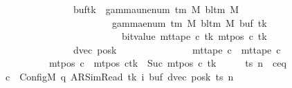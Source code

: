 \begin{isabellebody}
\ \ \ \ \ \ \ \ \ \ \ \ \ \ \ \ \ \ \ \ buf{\isacharparenleft}{\kern0pt}tk\ {\isacharcolon}{\kern0pt}{\isacharequal}{\kern0pt}\ gamma{\isacharunderscore}{\kern0pt}unenum\ {\isacharparenleft}{\kern0pt}{\isasymGamma}{\isacharunderscore}{\kern0pt}tm\ M{\isacharparenright}{\kern0pt}\ {\isacharparenleft}{\kern0pt}bl{\isacharunderscore}{\kern0pt}tm\ M{\isacharparenright}{\kern0pt}\isanewline
\ \ \ \ \ \ \ \ \ \ \ \ \ \ \ \ \ \ \ \ \ \ \ \ \ \ {\isacharparenleft}{\kern0pt}{}\ {\isacharasterisk}{\kern0pt}\ gamma{\isacharunderscore}{\kern0pt}enum\ {\isacharparenleft}{\kern0pt}{\isasymGamma}{\isacharunderscore}{\kern0pt}tm\ M{\isacharparenright}{\kern0pt}\ {\isacharparenleft}{\kern0pt}bl{\isacharunderscore}{\kern0pt}tm\ M{\isacharparenright}{\kern0pt}\ {\isacharparenleft}{\kern0pt}buf\ tk{\isacharparenright}{\kern0pt}\isanewline
\ \ \ \ \ \ \ \ \ \ \ \ \ \ \ \ \ \ \ \ \ \ \ \ \ \ \ \ \ {\isacharplus}{\kern0pt}\ bit{\isacharunderscore}{\kern0pt}value\ {\isacharparenleft}{\kern0pt}mt{\isacharunderscore}{\kern0pt}tape\ c{\isacharprime}{\kern0pt}\ tk\ {\isacharparenleft}{\kern0pt}mt{\isacharunderscore}{\kern0pt}pos\ c{\isacharprime}{\kern0pt}\ tk{\isacharparenright}{\kern0pt}{\isacharparenright}{\kern0pt}{\isacharparenright}{\kern0pt}{\isacharparenright}{\kern0pt}{\isacharcomma}{\kern0pt}\isanewline
\ \ \ \ \ \ \ \ \ \ \ \ \ \ \ \ \ \ \ \ dvec{\isacharcomma}{\kern0pt}\ posk{\isacharparenright}{\kern0pt}\isanewline
\ \ \ \ \ \ \ \ \ \ \ \ \ \ {\isasymand}\ mt{\isacharunderscore}{\kern0pt}tape\ c{\isacharprime}{\kern0pt}{\isacharprime}{\kern0pt}\ {\isacharequal}{\kern0pt}\ mt{\isacharunderscore}{\kern0pt}tape\ c{\isacharprime}{\kern0pt}\isanewline
\ \ \ \ \ \ \ \ \ \ \ \ \ \ {\isasymand}\ mt{\isacharunderscore}{\kern0pt}pos\ c{\isacharprime}{\kern0pt}{\isacharprime}{\kern0pt}\ {\isacharequal}{\kern0pt}\ {\isacharparenleft}{\kern0pt}mt{\isacharunderscore}{\kern0pt}pos\ c{\isacharprime}{\kern0pt}{\isacharparenright}{\kern0pt}{\isacharparenleft}{\kern0pt}tk\ {\isacharcolon}{\kern0pt}{\isacharequal}{\kern0pt}\ Suc\ {\isacharparenleft}{\kern0pt}mt{\isacharunderscore}{\kern0pt}pos\ c{\isacharprime}{\kern0pt}\ tk{\isacharparenright}{\kern0pt}{\isacharparenright}{\kern0pt}{\isachardoublequoteclose}\isanewline
%
\isadelimproof
%
\endisadelimproof
%
\isatagproof
{}\isamarkupfalse%
\ {\isacharminus}{\kern0pt}\isanewline
\ \ \isamarkupfalse%
\ ts\ n\ \ c{\isacharprime}{\kern0pt}{\isacharunderscore}{\kern0pt}eq{\isacharcolon}{\kern0pt}\isanewline
\ \ \ \ \ \ {\isachardoublequoteopen}c{\isacharprime}{\kern0pt}\ {\isacharequal}{\kern0pt}\ Config\isactrlsub M\ {\isacharparenleft}{\kern0pt}q{\isacharcomma}{\kern0pt}\ AR{\isacharunderscore}{\kern0pt}SimRead{\isacharcomma}{\kern0pt}\ tk{\isacharcomma}{\kern0pt}\ i{\isacharcomma}{\kern0pt}\ buf{\isacharcomma}{\kern0pt}\ dvec{\isacharcomma}{\kern0pt}\ posk{\isacharparenright}{\kern0pt}\ ts\ n{\isachardoublequoteclose}\isanewline

\end{isabellebody}
